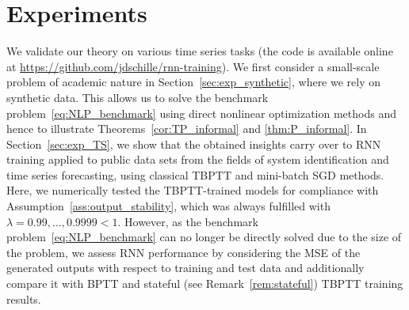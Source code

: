 \documentclass{article} %
\begin{document}
\section{Experiments}\label{sec:exp}

We validate our theory on various time series tasks (the code is available online at \url{https://github.com/jdschille/rnn-training}).
We first consider a small-scale problem of academic nature in Section~\ref{sec:exp_synthetic}, where we rely on synthetic data. This allows us to solve the benchmark problem~\eqref{eq:NLP_benchmark} using direct nonlinear optimization methods and hence to illustrate Theorems~\ref{cor:TP_informal} and \ref{thm:P_informal}.
In Section~\ref{sec:exp_TS}, we show that the obtained insights carry over to RNN training applied to public data sets from the fields of system identification and time series forecasting, using classical TBPTT and mini-batch SGD methods.
Here, we numerically tested the TBPTT-trained models for compliance with Assumption~\ref{ass:output_stability}, which was always fulfilled with $\lambda=0.99,\ldots,0.9999<1$.
However, as the benchmark problem~\eqref{eq:NLP_benchmark} can no longer be directly solved due to the size of the problem, we assess RNN performance by considering the MSE of the generated outputs with respect to training and test data and additionally compare it with BPTT and stateful (see Remark~\ref{rem:stateful}) TBPTT training results.
\end{document}
